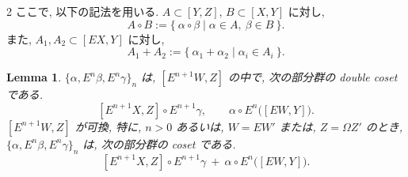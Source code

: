 \documentclass[10pt, leqno]{ltjsarticle}
\newcommand{\Ex}{E}        %
\numberwithin{equation}{section}
\theoremstyle{plain}
\newtheorem{lemma}[theorem]{Lemma}
\theoremstyle{definition}
\theoremstyle{remark}
\begin{document}
\begin{paracol}{2}
ここで, 以下の記法を用いる. 
$A\subset[Y, Z]$, $B\subset[X, Y]$ に対し,
\[
A\circ B :=\{\ \alpha\circ\beta\mid \alpha\in A,\ \beta\in B\ \}.
\]
また, $A_1,A_2\subset[\Ex X, Y]$ に対し,
\[
A_1+A_2 :=\{\ \alpha_1+\alpha_2\mid \alpha_i\in A_i\ \}.
\]
\begin{lemma}\label{lem:double-coset}
$\{\alpha,\Ex^n\beta,\Ex^n\gamma\}_n$ は,
$[\Ex^{n+1}W, Z]$ の中で,
次の部分群の double coset である.
\[
[\Ex^{n+1}X, Z]\circ \Ex^{n+1}\gamma, \qquad
\alpha\circ \Ex^n\!\bigl([\Ex W, Y]\bigr).
\]
$[\Ex^{n+1}W, Z]$ が可換,
特に, $n>0$ あるいは, $W=\Ex W'$ または, $Z=\Omega Z'$ のとき, \\
\(
\{\alpha,\Ex^n\beta,\Ex^n\gamma\}_n
\)
は, 次の部分群の coset である.
\[
[\Ex^{n+1}X, Z]\circ \Ex^{n+1}\gamma \ +\ 
\alpha\circ \Ex^n\!\bigl([\Ex W, Y]\bigr).
\]
\end{lemma}

\switchcolumn

\end{paracol}
\end{document}
